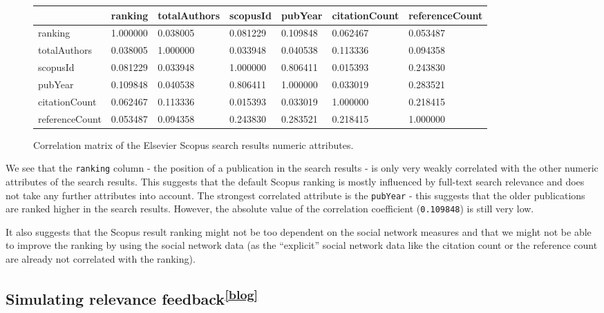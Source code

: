 \begin{figure}[ht!]
        \scriptsize
        \centering
        \begin{tabular}{|l|l|l|l|l|l|l|}
        \hline
            ~ & ranking & totalAuthors & scopusId & pubYear & citationCount & referenceCount \\ \hline
            ranking & 1.000000 & 0.038005 & 0.081229 & 0.109848 & 0.062467 & 0.053487 \\ \hline
            totalAuthors & 0.038005 & 1.000000 & 0.033948 & 0.040538 & 0.113336 & 0.094358 \\ \hline
            scopusId & 0.081229 & 0.033948 & 1.000000 & 0.806411 & 0.015393 & 0.243830 \\ \hline
            pubYear & 0.109848 & 0.040538 & 0.806411 & 1.000000 & 0.033019 & 0.283521 \\ \hline
            citationCount & 0.062467 & 0.113336 & 0.015393 & 0.033019 & 1.000000 & 0.218415 \\ \hline
            referenceCount & 0.053487 & 0.094358 & 0.243830 & 0.283521 & 0.218415 & 1.000000 \\ \hline
        \end{tabular}
    \caption{Correlation matrix of the Elsevier Scopus search results numeric attributes.} 
\end{figure}

We see that the \texttt{ranking} column - the position of a publication in the search results - is only very weakly correlated with the other numeric attributes of the search results.
This suggests that the default Scopus ranking is mostly influenced by full-text search relevance and does not take any further attributes into account.
The strongest correlated attribute is the \texttt{pubYear} - this suggests that the older publications are ranked higher in the search results.
However, the absolute value of the correlation coefficient (\texttt{0.109848}) is still very low.

It also suggests that the Scopus result ranking might not be too dependent on the social network measures and that we might not be able to improve the ranking 
by using the social network data (as the ``explicit'' social network data like the citation count or the reference count are already not correlated with the ranking).

\subsection[Simulating relevance feedback]{Simulating relevance feedback\textsuperscript{\href{https://jindrich.bar/edu/thesis-blog/ndcg-benchmark/}{[blog]}}}

